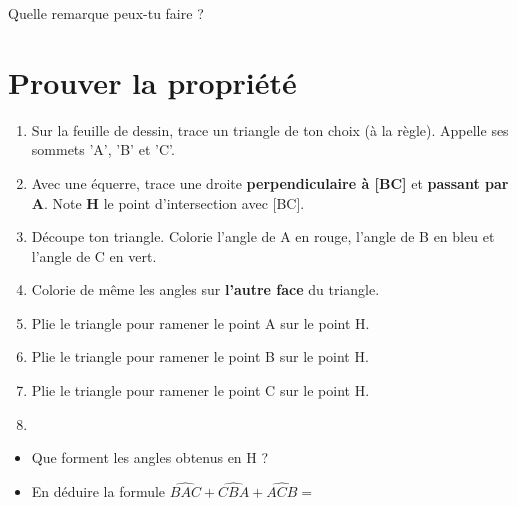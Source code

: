\documentclass[a4paper,11pt]{article}
\begin{document}
\vspace{1em}
Quelle remarque peux-tu faire ? \dotfill

\section{Prouver la propriété}


\vspace{0.5em}

\begin{enumerate}
	\item Sur la feuille de dessin, trace un triangle de ton choix (à la règle). Appelle ses sommets 'A', 'B' et 'C'.
	\item Avec une équerre, trace une droite \textbf{perpendiculaire à [BC]} et \textbf{passant par A}. Note \textbf{H} le point d'intersection avec [BC].
	\item Découpe ton triangle. Colorie l'angle de A en {\color{red}rouge}, l'angle de B en {\color{blue}bleu} et l'angle de C en {\color{green}vert}.
	\item Colorie de même les angles sur \textbf{l'autre face} du triangle.
	\item Plie le triangle pour ramener le point A sur le point H.
	\item Plie le triangle pour ramener le point B sur le point H.
	\item Plie le triangle pour ramener le point C sur le point H.
	\item {}
\end{enumerate}


\begin{itemize}
	\item Que forment les angles obtenus en H ? \dotfill
	\item En déduire la formule $\widehat{BAC} + \widehat{CBA} + \widehat{ACB} = $ \dotfill
\end{itemize}
\end{document}
